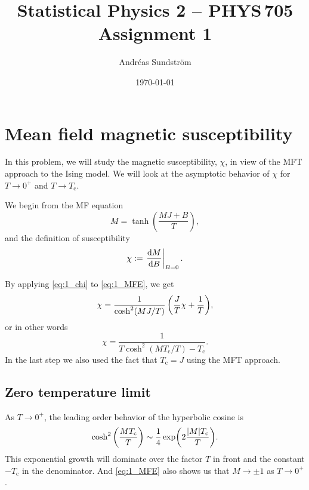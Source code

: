 \documentclass[11pt,letter, swedish, english
]{article}
\newcommand{\Tc}{\ensuremath{T_{\text{c}}}}
\begin{document}




\title{Statistical Physics 2 -- PHYS\,705 \\
Assignment 1}
\author{Andréas Sundström}
\date{\today}

\maketitle


\section{Mean field magnetic susceptibility}
\renewcommand{\thesubsection}{\arabic{section} (\roman{subsection})}

In this problem, we will study the magnetic susceptibility, $\chi$, in
view of the MFT approach to the Ising model. We will look at the
asymptotic behavior of $\chi$ for $T\to0^+$ and $T\to\Tc$.

We begin from the MF equation
\begin{equation}\label{eq:1_MFE}
M=\tanh(\frac{MJ + B}{T}),
\end{equation}
and the definition of susceptibility
\begin{equation}\label{eq:1_chi}
\chi:=\eval{\dv{M}{B}}_{B=0}.
\end{equation}

By applying \eqref{eq:1_chi} to \eqref{eq:1_MFE}, we get
\begin{equation}
\chi=\frac{1}{\cosh^2(MJ/T)}\, 
\qty(\frac{J}{T}\chi+\frac{1}{T}),
\end{equation}
or in other words
\begin{equation}\label{eq:1_chi_exact}
\chi=\frac{1}{T\cosh^2(M\Tc/T)-\Tc}.
\end{equation}
In the last step we also used the fact that $\Tc=J$ using the MFT approach.

\subsection{Zero temperature limit}
As $T\to0^+$, the leading order behavior of the hyperbolic cosine is
\begin{equation}
\cosh^2\qty(\frac{M\Tc}{T})\sim \frac{1}{4}\exp(2\frac{\abs{M}\Tc}{T}).
\end{equation}
This exponential growth will dominate over the factor $T$ in
front and the constant $-\Tc$ in the denominator. And \eqref{eq:1_MFE}
also shows us that $M\to\pm1$ as $T\to0^+$. 
\end{document}
